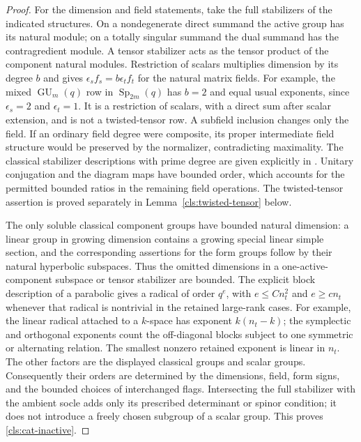 \begin{proof}
For the dimension and field statements, take the full stabilizers of
the indicated structures.  On a nondegenerate direct summand the
active group has its natural module; on a totally singular summand
the dual summand has the contragredient module.  A tensor stabilizer
acts as the tensor product of the component natural modules.
Restriction of scalars multiplies dimension by its degree $b$ and
gives $\epsilon_s f_s=b\epsilon_t f_t$ for the natural matrix
fields.  For example, the mixed $\operatorname{GU}_m(q)$ row in
$\operatorname{Sp}_{2m}(q)$ has $b=2$ and equal usual exponents,
since $\epsilon_s=2$ and $\epsilon_t=1$.  It is a restriction of
scalars, with a direct sum after scalar extension, and is not a
twisted-tensor row.  A subfield inclusion changes only the field.
If an ordinary field degree were composite, its proper intermediate
field structure would be preserved by the normalizer, contradicting
maximality.  The classical stabilizer descriptions with prime degree
are given explicitly in
\cite[proofs of Lemmas~5.5 and~5.7]{BurnessLiebeckShalev2017}.
Unitary conjugation and the diagram maps have bounded order, which
accounts for the permitted bounded ratios in the remaining field
operations.  The
twisted-tensor assertion is proved separately in
Lemma~\ref{cls:twisted-tensor} below.

The only soluble classical component groups have bounded natural
dimension: a linear group in growing dimension contains a growing
special linear simple section, and the corresponding assertions for
the form groups follow by their natural hyperbolic subspaces.
Thus the omitted dimensions in a one-active-component subspace or
tensor stabilizer are bounded.  The explicit block description of a
parabolic gives a radical of order $q^e$, with $e\leq Cn_t^2$ and
$e\geq c n_t$ whenever that radical is nontrivial in the retained
large-rank cases.  For example, the linear radical attached to a
$k$-space has exponent $k(n_t-k)$; the symplectic and orthogonal
exponents count the off-diagonal blocks subject to one symmetric or
alternating relation.  The smallest nonzero retained exponent is
linear in $n_t$.  The other factors are the displayed classical
groups and scalar groups.  Consequently their orders are determined
by the dimensions, field, form signs, and the bounded choices of
interchanged flags.  Intersecting the full stabilizer with the ambient
socle adds only its prescribed determinant or spinor condition; it
does not introduce a freely chosen subgroup of a scalar group.  This
proves \ref{cls:cat-inactive}.


\end{proof}
